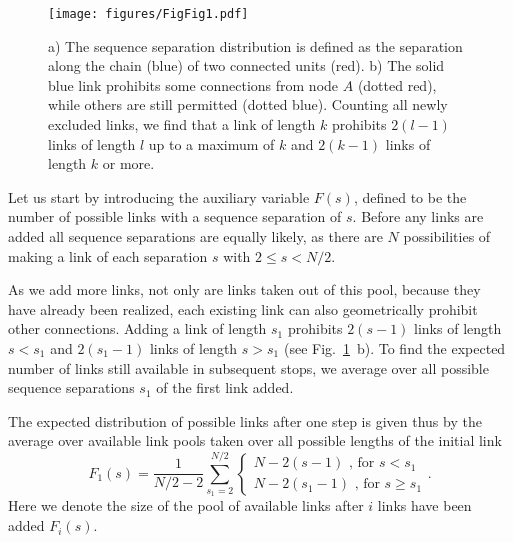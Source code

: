 \documentclass[
reprint,
twocolumn,
amsmath,amssymb,superscriptaddress,aps,
pre]{revtex4-1}
\begin{document}
\begin{figure}[h]
    \centering
    \texttt{[image: figures/FigFig1.pdf]}
    \caption{a) The sequence separation distribution is defined as the separation along the chain (blue) of two connected units (red). b) The solid blue link prohibits some connections from node $A$ (dotted red), while others are still permitted (dotted blue). Counting all newly excluded links, we find that a link of length $k$ prohibits $2(l-1)$ links of length $l$ up to a maximum of $k$ and $2(k-1)$ links of length $k$ or more.}
    \label{fig:schematic}
\end{figure}

Let us start by introducing the auxiliary variable $F(s)$, defined to be the number of possible links with a sequence separation of $s$. Before any links are added all sequence separations are equally likely, as there are $N$ possibilities of making a link of each separation $s$ with $2\leq s < N/2$.

As we add more links, not only are links taken out of this pool, because they have already been realized, each existing link can also geometrically prohibit other connections. Adding a link of length $s_1$ prohibits $2(s-1)$ links of length $s<s_1$ and $2(s_1-1)$ links of length $s>s_1$ (see Fig.~\ref{fig:schematic}~b). To find the expected number of links still available in subsequent stops, we average over all possible sequence separations $s_1$ of the first link added.

The expected distribution of possible links after one step is given thus by the average over available link pools taken over all possible lengths of the initial link
\begin{equation}
    F_1(s)= \frac{1}{N/2-2} \sum_{s_1=2}^{N/2} { \begin{cases}
    N-2(s-1) \text{ , for } s<s_1\\
    N-2(s_1 -1)\text{ , for } s\geq s_1
    \end{cases}}.
\end{equation}
Here we denote the size of the pool of available links after $i$ links have been added $F_i(s)$.
\end{document}
